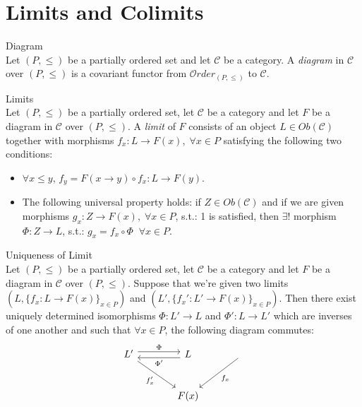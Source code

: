 \section{Limits and Colimits}

\begin{definition}{Diagram}\\
Let $(P,\leq)$ be a partially ordered set and let $\mathcal{C}$ be a category. A \textit{diagram} in $\mathcal{C}$ over $(P,\leq)$ is a covariant functor from $\mathcal{O}rder_{(P,\leq)}$ to $\mathcal{C}$.
\end{definition}

\begin{definition}{Limits}\\
Let $(P,\leq)$ be a partially ordered set, let $\mathcal{C}$ be a category and let $F$ be a diagram in $\mathcal{C}$ over $(P,\leq)$. A \textit{limit} of $F$ consists of an object $L \in Ob(\mathcal{C})$ together with morphisms $f_x : L \to F(x), \;\forall x \in P$ satisfying the following two conditions:
\begin{itemize}
    \item $\forall x\leq y$, $f_y = F(x \to y) \circ f_x: L \to F(y)$.
    \item The following universal property holds: if $Z \in Ob(\mathcal{C})$ and if we are given morphisms $g_x: Z \to F(x), \;\forall x \in P$, s.t.: 1 is satisfied, then $\exists !$ morphism $\Phi: Z \to L$, s.t.: $g_x = f_x \circ \Phi \;\;\forall x \in P$.
\end{itemize}
\end{definition}

\begin{proposition}{Uniqueness of Limit}\\
Let $(P,\leq)$ be a partially ordered set, let $\mathcal{C}$ be a category and let $F$ be a diagram in $\mathcal{C}$ over $(P,\leq)$. Suppose that we're given two limits $(L, \{f_x: L \to F(x)\}_{x\in P})$ and $(L', \{f_x': L' \to F(x)\}_{x\in P})$. Then there exist uniquely determined isomorphisms $\Phi:L' \to L$ and $\Phi': L \to L'$ which are inverses of one another and such that $\forall x \in P$, the following diagram commutes:
$$\begin{tikzcd}[row sep=large, column sep=large]
    L' \arrow[r, shift left=0.7ex, "\Phi"] \arrow[dr, "f_x'"'] & L \arrow[l, shift left=0.7ex, "\Phi'"] & \arrow[dl, "f_x"] \\
    & F(x)
\end{tikzcd}$$
\end{proposition}

